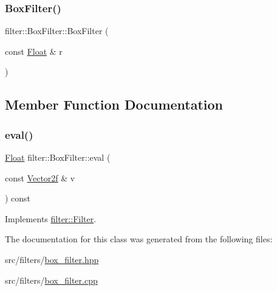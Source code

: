 \subsubsection{\texorpdfstring{BoxFilter()}{BoxFilter()}}
{\footnotesize\ttfamily filter\+::\+Box\+Filter\+::\+Box\+Filter (\begin{DoxyParamCaption}\item[{const \mbox{\hyperlink{cyclop_8hpp_a07afd7094cb489cbd514c76e6f55d34f}{Float}} \&}]{r }\end{DoxyParamCaption})}



\subsection{Member Function Documentation}
\mbox{\label{classfilter_1_1BoxFilter_ac7219a821f510523fef5db0b3b5830d7}} 
\subsubsection{\texorpdfstring{eval()}{eval()}}
{\footnotesize\ttfamily \mbox{\hyperlink{cyclop_8hpp_a07afd7094cb489cbd514c76e6f55d34f}{Float}} filter\+::\+Box\+Filter\+::eval (\begin{DoxyParamCaption}\item[{const \mbox{\hyperlink{cyclop_8hpp_a0c5eff6545fe0b71d0592c88d930b697}{Vector2f}} \&}]{v }\end{DoxyParamCaption}) const\hspace{0.3cm}{\ttfamily [virtual]}}



Implements \mbox{\hyperlink{classfilter_1_1Filter_a0d77f7ce8b9b519b4b086e1c01125ec1}{filter\+::\+Filter}}.



The documentation for this class was generated from the following files\+:\begin{DoxyCompactItemize}
\item 
src/filters/\mbox{\hyperlink{box__filter_8hpp}{box\+\_\+filter.\+hpp}}\item 
src/filters/\mbox{\hyperlink{box__filter_8cpp}{box\+\_\+filter.\+cpp}}\end{DoxyCompactItemize}
